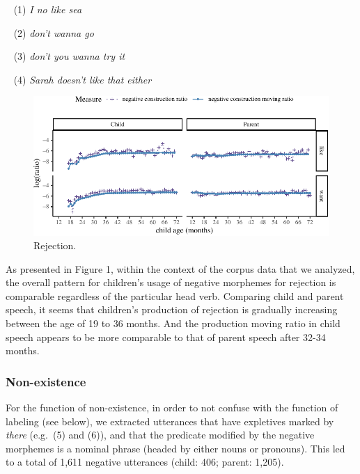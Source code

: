 \documentclass[10pt, letterpaper]{article}
\newenvironment{CodeChunk}{}{}
\begin{document}
~ (1) \emph{I no like sea}

~ (2) \emph{don't wanna go}

~ (3) \emph{don't you wanna try it}

~ (4) \emph{Sarah doesn't like that either}

\begin{figure}[h]

\begin{CodeChunk}


\begin{center}\includegraphics{figs/emotion-1} \end{center}

\end{CodeChunk}
\caption[This image spans both columns]{Rejection.}\label{fig:rejection}
\end{figure}

As presented in Figure 1, within the context of the corpus data that we
analyzed, the overall pattern for children's usage of negative morphemes
for rejection is comparable regardless of the particular head verb.
Comparing child and parent speech, it seems that children's production
of rejection is gradually increasing between the age of 19 to 36 months.
And the production moving ratio in child speech appears to be more
comparable to that of parent speech after 32-34 months.

\hypertarget{non-existence}{%
\subsubsection{Non-existence}\label{non-existence}}

For the function of non-existence, in order to not confuse with the
function of labeling (see below), we extracted utterances that have
expletives marked by \emph{there} (e.g.~(5) and (6)), and that the
predicate modified by the negative morphemes is a nominal phrase (headed
by either nouns or pronouns). This led to a total of 1,611 negative
utterances (child: 406; parent: 1,205).
\end{document}
